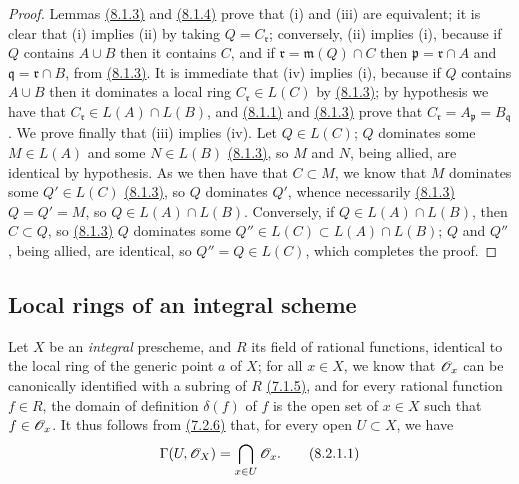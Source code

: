 \begin{proof}
\label{proof-prop-1.8.1.5}
Lemmas \hyperref[lem-1.8.1.3]{(8.1.3)} and \hyperref[lem-1.8.1.4]{(8.1.4)} prove that (i) and (iii) are equivalent; it
is clear that (i) implies (ii) by taking $Q=C_\mathfrak{r}$; conversely, (ii)
implies (i), because if $Q$ contains $A\cup B$ then it contains $C$, and if
$\mathfrak{r}=\mathfrak{m}(Q)\cap C$ then $\mathfrak{p}=\mathfrak{r}\cap A$ and
$\mathfrak{q}=\mathfrak{r}\cap B$, from \hyperref[lem-1.8.1.3]{(8.1.3)}. It is immediate that (iv)
implies (i), because if $Q$ contains $A\cup B$ then it dominates a local ring
$C_\mathfrak{r}\in L(C)$ by \hyperref[lem-1.8.1.3]{(8.1.3)}; by hypothesis we have that
$C_\mathfrak{r}\in L(A)\cap L(B)$, and \hyperref[lem-1.8.1.1]{(8.1.1)} and \hyperref[lem-1.8.1.3]{(8.1.3)} prove that
$C_\mathfrak{r}=A_\mathfrak{p}=B_\mathfrak{q}$. We prove finally that (iii)
implies (iv). Let $Q\in L(C)$; $Q$ dominates some $M\in L(A)$ and some $N\in
L(B)$ \hyperref[lem-1.8.1.3]{(8.1.3)}, so $M$ and $N$, being allied, are identical by hypothesis.
As we then have that $C\subset M$, we know that $M$ dominates some $Q'\in L(C)$
\hyperref[lem-1.8.1.3]{(8.1.3)}, so $Q$ dominates $Q'$, whence necessarily \hyperref[lem-1.8.1.3]{(8.1.3)} $Q=Q'=M$,
so $Q\in L(A)\cap L(B)$. Conversely, if $Q\in L(A)\cap L(B)$, then $C\subset
Q$, so \hyperref[lem-1.8.1.3]{(8.1.3)} $Q$ dominates some $Q''\in L(C)\subset L(A)\cap L(B)$; $Q$
and $Q''$, being allied, are identical, so $Q''=Q\in L(C)$, which completes the
proof.
\end{proof}

\subsection{Local rings of an integral scheme}
\label{subsection-local-rings-of-integral-scheme}

\begin{env}[8.2.1]
\label{env-1.8.2.1}
Let $X$ be an {\it integral} prescheme, and $R$ its field of
rational functions, identical to the local ring of the generic point $a$ of $X$;
for all $x\in X$, we know that $\mathscr{O}_x$ can be canonically identified with a
subring of $R$ \hyperref[env-1.7.1.5]{(7.1.5)}, and for every rational function $f\in R$, the
domain of definition $\delta(f)$ of $f$ is the open set of $x\in X$ such that
$f\in\mathscr{O}_x$. It thus follows from \hyperref[env-1.7.2.6]{(7.2.6)} that, for every open $U\subset X$,
we have
\[
  \Gamma(U,\mathscr{O}_X)=\bigcap_{x\in U}\mathscr{O}_x.
  \tag{8.2.1.1}
\]
\end{env}

